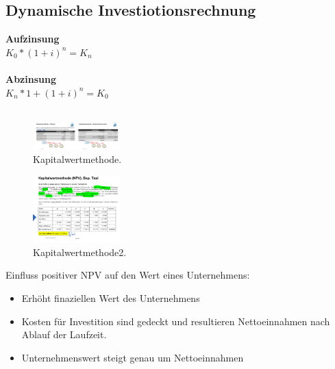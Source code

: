 \documentclass[../ZF_Wing.tex]{subfiles}
\begin{document}
\subsection{Dynamische Investiotionsrechnung}
\textbf{Aufzinsung}\\
$K_{0} * (1 + i)^{n} = K_{n}$\\\\
\textbf{Abzinsung}\\
$K_{n} * 1+(1 + i)^{n} = K_{0}$\\\\
\begin{figure}[H]
\centering
\includegraphics[width=0.3\textwidth]{Resources/Image/Kapitalwertmethode.png}
\caption{\label{fig:Kapitalwertmethode}Kapitalwertmethode.}
\end{figure}
\begin{figure}[H]
\centering
\includegraphics[width=0.3\textwidth]{Resources/Image/Kapitalwertmethode2.png}
\caption{\label{fig:Kapitalwertmethode2}Kapitalwertmethode2.}
\end{figure}
Einfluss positiver NPV auf den Wert eines Unternehmens:\\
\begin{itemize}
	\item Erhöht finaziellen Wert des Unternehmens
	\item Kosten für Investition sind gedeckt und resultieren Nettoeinnahmen nach Ablauf der Laufzeit.
	\item Unternehmenswert steigt genau um Nettoeinnahmen
\end{itemize}
\end{document}
